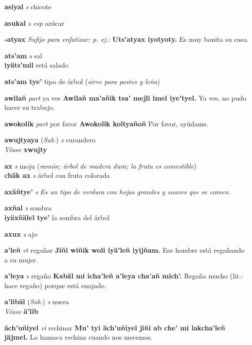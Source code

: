 \documentclass[10pt]{scrbook}
\newcommand{\entry}[1]{\textbf{#1}}
\newcommand{\alphaletter}[1]{\end{multicols}\addsec{#1}\begin{multicols}{2}}
\newcommand{\nontranslationdef}[1]{\textit{#1}}
\newcommand{\partofspeech}[1]{\textit{#1}}
\newcommand{\spanishtranslation}[1]{#1}
\newcommand{\clarification}[1]{(\textit{#1})}
\newcommand{\cholexample}[1]{\textbf{#1}}
\newcommand{\exampletranslation}[1]{#1}
\newcommand{\alsosee}[1]{\\\textit{Véase} \textbf{#1}}
\newcommand{\relevantdialect}[1]{(\textit{#1})}
\newcommand{\secondaryentry}[1]{\\\textbf{#1}}
\newcommand{\secondpartofspeech}[1]{\textit{#1}}
\newcommand{\secondtranslation}[1]{#1}
\begin{document}
\begin{multicols}{2}
\entry{asiyal}
\partofspeech{s}
\spanishtranslation{chicote}

\entry{asukal}
\partofspeech{s esp}
\spanishtranslation{azúcar}

\entry{-atyax}
\nontranslationdef{Sufijo para enfatizar; p. ej.:}
\cholexample{Uts'atyax iyotyoty.}
\exampletranslation{Es muy bonita su casa.}

\entry{ats'am}
\partofspeech{s}
\spanishtranslation{sal}
\secondaryentry{iyäts'mil}
\secondtranslation{está salado}

\entry{ats'am tye'}
\spanishtranslation{tipo de árbol}
\clarification{sirve para postes y leña}

\entry{awilañ}
\partofspeech{part}
\spanishtranslation{ya ves}
\cholexample{Awilañ ma'añik tsa' mejli imel iye'tyel.}
\exampletranslation{Ya ves, no pudo hacer su trabajo.}

\entry{awokolik}
\partofspeech{part}
\spanishtranslation{por favor}
\cholexample{Awokolik koltyañoñ}
\exampletranslation{Por favor, ayúdame.}

\entry{awujtyaya}
\relevantdialect{Sab.}
\partofspeech{s}
\spanishtranslation{curandero}
\alsosee{xwujty}

\entry{ax}
\partofspeech{s}
\spanishtranslation{moju}
\clarification{ramón; árbol de madera dura; la fruta es comestible}
\secondaryentry{chäk ax}
\secondpartofspeech{s}
\secondtranslation{árbol con fruta colorada}

\entry{axäñtye'}
\partofspeech{s}
\nontranslationdef{Es un tipo de verdura con hojas grandes y suaves que se comen.}

\entry{axñal}
\partofspeech{s}
\spanishtranslation{sombra}
\secondaryentry{iyäxñälel tye'}
\secondtranslation{la sombra del árbol}

\entry{axux}
\partofspeech{s}
\spanishtranslation{ajo}

\entry{a'leñ}
\partofspeech{vt}
\spanishtranslation{regañar}
\cholexample{Jiñi wiñik woli iyä'leñ iyijñam.}
\exampletranslation{Ese hombre está regañando a su mujer.}

\entry{a'leya}
\partofspeech{s}
\spanishtranslation{regaño}
\cholexample{Kabäl mi icha'leñ a'leya cha'añ mich'.}
\exampletranslation{Regaña mucho (lit.: hace regaño) porque está enojado.}

\entry{a'libäl}
\relevantdialect{Sab.}
\partofspeech{s}
\spanishtranslation{nuera}
\alsosee{ä'lib}

\alphaletter{Ä}

\entry{äch'uñiyel}
\partofspeech{vi}
\spanishtranslation{rechinar}
\cholexample{Mu' tyi äch'uñiyel jiñi ab che' mi lakcha'leñ jäjmel.}
\exampletranslation{La hamaca rechina cuando nos mecemos.}


\end{multicols}
\end{document}
